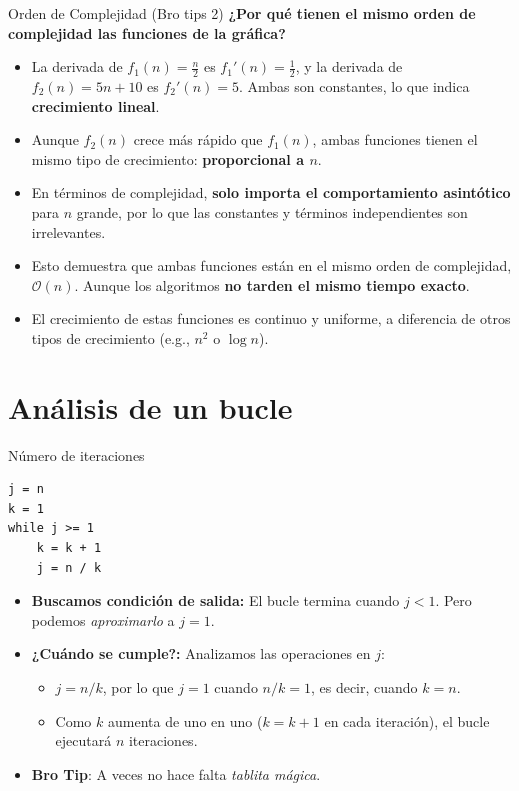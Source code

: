 \documentclass[aspectratio=169]{beamer}
\begin{document}
\begin{frame}{Orden de Complejidad (Bro tips 2)}
\textbf{¿Por qué tienen el mismo orden de complejidad las funciones de la gráfica?}
\begin{itemize}
    \item La derivada de \(f_1(n) = \frac{n}{2}\) es \(f_1'(n) = \frac{1}{2}\), y la derivada de \(f_2(n) = 5n + 10\) es \(f_2'(n) = 5\). Ambas son constantes, lo que indica \textbf{crecimiento lineal}.
    \item Aunque \(f_2(n)\) crece más rápido que \(f_1(n)\), ambas funciones tienen el mismo tipo de crecimiento: \textbf{proporcional a \(n\)}.
    \item En términos de complejidad, \textbf{solo importa el comportamiento asintótico} para \(n\) grande, por lo que las constantes y términos independientes son irrelevantes.
    \item Esto demuestra que ambas funciones están en el mismo orden de complejidad, \(\mathcal{O}(n)\). Aunque los algoritmos \textbf{no tarden el mismo tiempo exacto}.
    \item El crecimiento de estas funciones es continuo y uniforme, a diferencia de otros tipos de crecimiento (e.g., \(n^2\) o \(\log n\)).
\end{itemize}

\end{frame}

\section{Análisis de un bucle}

\begin{frame}[fragile]{Número de iteraciones}
\begin{verbatim}
j = n
k = 1
while j >= 1
    k = k + 1
    j = n / k
\end{verbatim}

\begin{itemize}
    \item \textbf{Buscamos condición de salida:} El bucle termina cuando \(j < 1\). Pero podemos \textit{aproximarlo} a \(j = 1\).
    \item \textbf{¿Cuándo se cumple?:} Analizamos las operaciones en \(j\):
    \begin{itemize}
        \item \(j = n / k\), por lo que \(j = 1\) cuando \(n / k = 1\), es decir, cuando \(k = n\).
        \item Como \(k\) aumenta de uno en uno (\(k = k + 1\) en cada iteración), el bucle ejecutará \(n\) iteraciones.
    \end{itemize}
    \item \textbf{Bro Tip}: A veces no hace falta \textit{tablita mágica}.
\end{itemize}
\end{frame}
\end{document}
